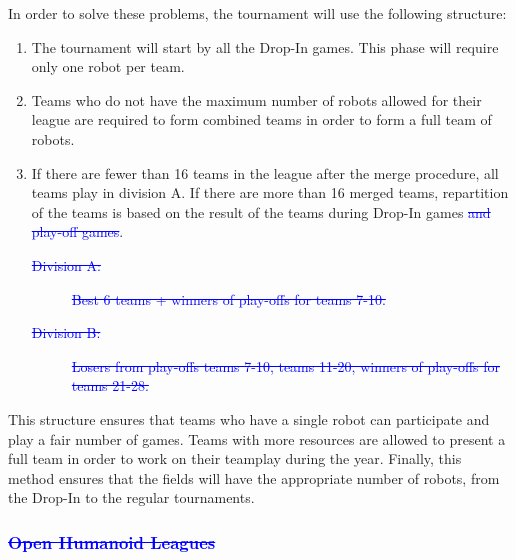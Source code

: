 \documentclass{article}
\newcommand{\removed}[1]{\textcolor{blue}{\sout{#1}}}
\newcommand{\added}[1]{{\color{magenta}{#1}}}
\DeclareRobustCommand{\hremoved}[1]{\texorpdfstring{\removed{#1}}{#1}}
\begin{document}
In order to solve these problems, the tournament will use the following
structure:
\begin{enumerate}
\item The tournament will start by all the Drop-In games. This phase will
  require only one robot per team.
\item Teams who do not have the maximum number of robots allowed for their league
  are required to form combined teams in order to form a full team of robots.
\item If there are fewer than 16 teams in the league after the merge procedure,
  all teams play in division A.
  If there are more than 16 merged teams, \added{initial} repartition of the teams is based
  on the result of the teams during Drop-In games \removed{and play-off games}.

  \added{
    The competition has the following structure:
    The best $N$ teams are qualified for the first round-robin phase of
    division A, other teams are qualified for the first round-robin in division B.

    Both divisions plays separate round robins.
    The lowest ranked teams per group in division A will have a playoff
    with the highest ranked teams per group in division B.
    The winners of the playoff games are qualified for the second round robin of
    division A, the losers will play the second round robin in
    division B.

    Thereafter, division A and division B proceed independently of each other and 
    each will normally consist of a round robin stage, followed by a number of knockout matches.
  }
  \begin{description}
  \item[\removed{Division A:}] \removed{Best 6 teams + winners of play-offs for teams 7-10.}
  \item[\removed{Division B:}] \removed{Losers from play-offs teams 7-10, teams 11-20,
    winners of play-offs for teams 21-28.}
  \end{description}
\end{enumerate}

This structure ensures that teams who have a single robot can participate and
play a fair number of games.
Teams with more resources are allowed to present a full team in order to work
on their teamplay during the year.
Finally, this method ensures that the fields will have the appropriate number
of robots, from the Drop-In to the regular tournaments.

\subsubsection{\added{Humanoid Open Competition} \hremoved{Open Humanoid Leagues}}
\end{document}
